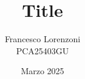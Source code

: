 


\title{Title}
\author{Francesco Lorenzoni\\\textsc{PCA25403GU}}
\date{Marzo 2025}


\makeatletter
\renewcommand{\l@section}{\@dottedtocline{1}{1.5em}{2.6em}}
\renewcommand{\l@subsection}{\@dottedtocline{2}{2.5em}{3.6em}}
\renewcommand{\l@subsubsection}{\@dottedtocline{3}{3.5em}{4.5em}}
\makeatother
{} %



\doparttoc[n]



\tableofcontents



